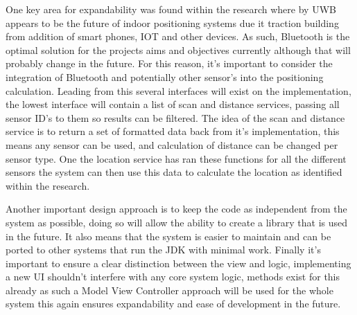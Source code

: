 One key area for expandability was found within the research where by UWB appears to be the future of indoor positioning systems due it traction building from addition of smart phones, IOT and other devices. As such, Bluetooth is the optimal solution for the projects aims and objectives currently although that will probably change in the future. For this reason, it's important to consider the integration of Bluetooth and potentially other sensor's into the positioning calculation. Leading from this several interfaces will exist on the implementation, the lowest interface will contain a list of scan and distance services, passing all sensor ID's to them so results can be filtered. The idea of the scan and distance service is to return a set of formatted data back from it's implementation, this means any sensor can be used, and calculation of distance can be changed per sensor type. One the location service has ran these functions for all the different sensors the system can then use this data to calculate the location as identified within the research.

Another important design approach is to keep the code as independent from the system as possible, doing so will allow the ability to create a library that is used in the future. It also means that the system is easier to maintain and can be ported to other systems that run the JDK with minimal work. Finally it's important to ensure a clear distinction between the view and logic, implementing a new UI shouldn't interfere with any core system logic, methods exist for this already as such a Model View Controller approach will be used for the whole system this again ensures expandability and ease of development in the future.